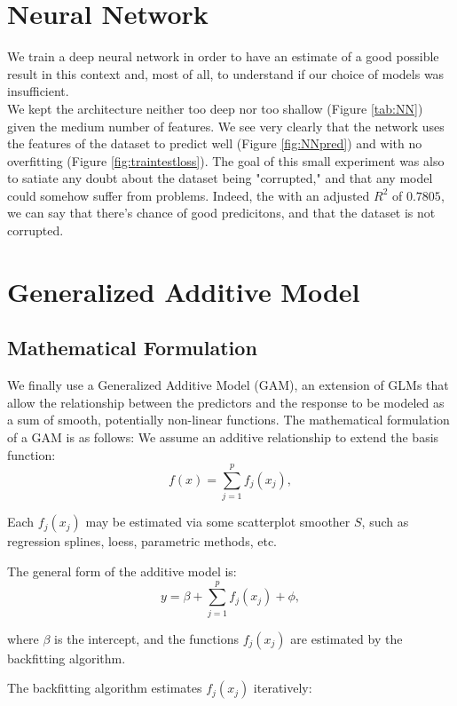 \documentclass[a4paper, 11pt]{article}
\begin{document}
\begin{multicols}{2}
\section{Neural Network} \vspace{-7pt}
We train a deep neural network in order to have an estimate of a good possible result in this context and, most of all, to understand if our choice of models was insufficient.\\
We kept the architecture neither too deep nor too shallow (Figure \ref{tab:NN}) given the medium number of features. We see very clearly that the network uses the features of the dataset to predict well (Figure \ref{fig:NNpred}) and with no overfitting (Figure \ref{fig:traintestloss}). The goal of this small experiment was also to satiate any doubt about the dataset being "corrupted," and that any model could somehow suffer from problems. Indeed, the with an adjusted \( R^2 \) of \( 0.7805 \), we can say that there's chance of good predicitons, and that the dataset is not corrupted.

\section{Generalized Additive Model}
\subsection{Mathematical Formulation}
We finally use a Generalized Additive Model (GAM), an extension of GLMs that allow the relationship between the predictors and the response to be modeled as a sum of smooth, potentially non-linear functions.
The mathematical formulation of a GAM is as follows:
We assume an additive relationship to extend the basis function:
\begin{equation}
f(x) = \sum_{j=1}^p f_j(x_j),
\end{equation}

Each \( f_j(x_j) \) may be estimated via some scatterplot smoother \( S \), such as regression splines, loess, parametric methods, etc.

The general form of the additive model is:
\begin{equation}
y = \beta + \sum_{j=1}^p f_j(x_j) + \phi,
\end{equation}

where \( \beta \) is the intercept, and the functions \( f_j(x_j) \) are estimated by the backfitting algorithm.

The backfitting algorithm estimates \( f_j(x_j) \) iteratively:


\end{multicols}
\end{document}
